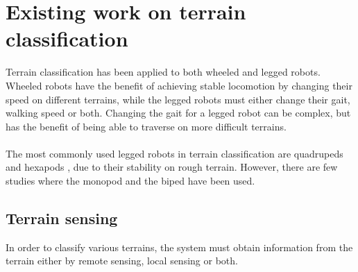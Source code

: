 \documentclass[USenglish]{ifimaster}  %
\begin{document}
	
\section{Existing work on terrain classification}
Terrain classification has been applied to both wheeled and legged robots. Wheeled robots have the benefit of achieving stable locomotion by changing their speed on different terrains, while the legged robots must either change their gait, walking speed or both. Changing the gait for a legged robot can be complex, but has the benefit of being able to traverse on more difficult terrains. 
\\
\\
The most commonly used legged robots in terrain classification are quadrupeds  \cite{6784609,littleDog,6849778,Hoffmann20141790} and hexapods \cite{Walas2015,26b23e912c654fe4b7478fd910130195,6569179}, due to their stability on rough terrain. However, there are few studies where the monopod \cite{5602459} and the biped \cite{7803265} have been used.

		
		
\subsection{Terrain sensing}
In order to classify various terrains, the system must obtain information from the terrain either by remote sensing, local sensing or both.
	
\end{document}
